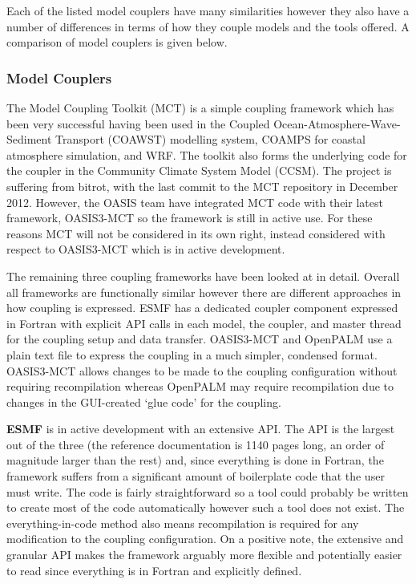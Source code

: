\documentclass{acm_proc_article-sp}
\renewcommand{\_}{\underscore\hspace{0pt}}
\begin{document}
Each of the listed model couplers have many similarities however they also have
a number of differences in terms of how they couple models and the tools
offered. A comparison of model couplers is given below.

\subsubsection*{Model Couplers}

The Model Coupling Toolkit (MCT) \cite{Larson2005,Jacob2005} is a simple
coupling framework which has been very successful having been used in the
Coupled Ocean-Atmosphere-Wave-Sediment Transport (COAWST) modelling system,
COAMPS for coastal atmosphere simulation, and WRF. The toolkit also forms the
underlying code for the coupler in the Community Climate System Model (CCSM).
The project is suffering from bitrot, with the last commit to the MCT repository
in December 2012. However, the OASIS team have integrated MCT code with their
latest framework, OASIS3-MCT so the framework is still in active use. For these
reasons MCT will not be considered in its own right, instead considered with
respect to OASIS3-MCT which is in active development.

The remaining three coupling frameworks have been looked at in detail. Overall
all frameworks are functionally similar however there are different approaches
in how coupling is expressed. ESMF has a dedicated coupler component expressed
in Fortran with explicit API calls in each model, the coupler, and master thread
for the coupling setup and data transfer. OASIS3-MCT and OpenPALM use a plain
text file to express the coupling in a much simpler, condensed format.
OASIS3-MCT allows changes to be made to the coupling configuration without
requiring recompilation whereas OpenPALM may require recompilation due to
changes in the GUI-created `glue code' for the coupling.

\textbf{ESMF} is in active development with an extensive API. The API is the
largest out of the three (the reference documentation is 1140 pages long, an
order of magnitude larger than the rest) and, since everything is done in
Fortran, the framework suffers from a significant amount of boilerplate code
that the user must write. The code is fairly straightforward so a tool could
probably be written to create most of the code automatically however such a tool
does not exist. The everything-in-code method also means recompilation is
required for any modification to the coupling configuration. On a positive note,
the extensive and granular API makes the framework arguably more flexible and
potentially easier to read since everything is in Fortran and explicitly
defined.
\end{document}
